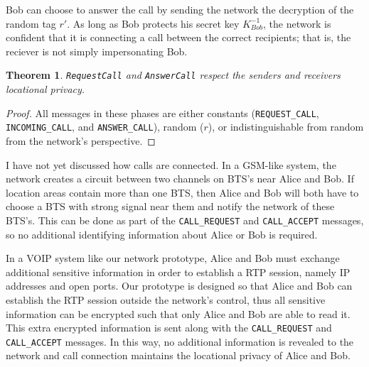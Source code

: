 \documentclass[11pt]{article}
\newtheorem{theorem}{Theorem}
\begin{document}
Bob can choose to answer the call by sending the network the decryption of the random tag $r'$. As long as Bob protects his secret key $K^{-1}_{Bob}$, the network is confident that it is connecting a call between the correct recipients; that is, the reciever is not simply impersonating Bob.

\begin{theorem}
	\emph{\texttt{RequestCall}} and \emph{\texttt{AnswerCall}} respect the senders and receivers locational privacy.
\end{theorem}
\begin{proof}
	All messages in these phases are either constants (\texttt{REQUEST_CALL}, \texttt{INCOMING_CALL}, and \texttt{ANSWER_CALL}), random ($r$), or indistinguishable from random from the network's perspective.
\end{proof}								
I have not yet discussed how calls are connected. In a GSM-like system, the network creates a circuit between two channels on BTS's near Alice and Bob. If location areas contain more than one BTS, then Alice and Bob will both have to choose a BTS with strong signal near them and notify the network of these BTS's. This can be done as part of the \texttt{CALL_REQUEST} and \texttt{CALL_ACCEPT} messages, so no additional identifying information about Alice or Bob is required.

In a VOIP system like our network prototype, Alice and Bob must exchange additional sensitive information in order to establish a RTP session, namely IP addresses and open ports. Our prototype is designed so that Alice and Bob can establish the RTP session outside the network's control, thus all sensitive information can be encrypted such that only Alice and Bob are able to read it. This extra encrypted information is sent along with the \texttt{CALL_REQUEST} and \texttt{CALL_ACCEPT} messages. In this way, no additional information is revealed to the network and call connection maintains the locational privacy of Alice and Bob. 


\end{document}
